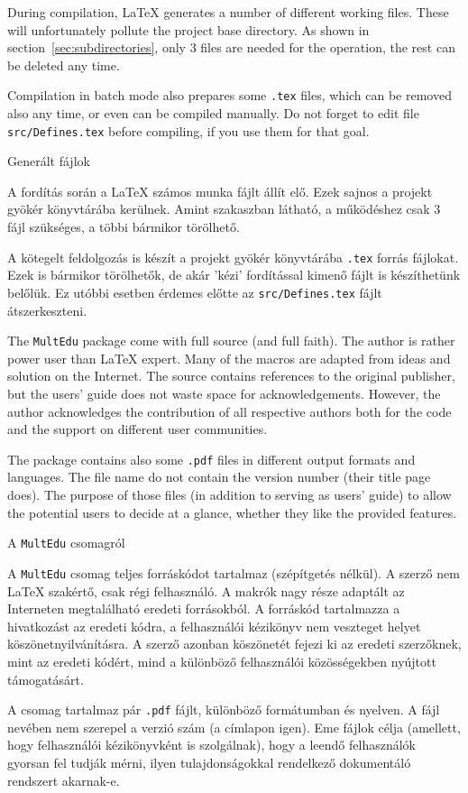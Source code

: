 {
During compilation, \LaTeX{} generates a number of different working files.
These will unfortunately pollute the project base directory. As shown
in section~\ref{sec:subdirectories}, only 3 files are needed for the operation,
the rest can be deleted any time.

Compilation in batch mode also prepares some \lstinline|.tex| files,
which can be removed also any time, or even can be compiled manually. 
Do not forget to edit file \lstinline|src/Defines.tex| before compiling,
if you use them for that goal.
}
{Generált fájlok}
{
A fordítás során a \LaTeX{} számos munka fájlt állít elő.
Ezek sajnos a projekt gyökér könyvtárába kerülnek. Amint  szakaszban látható, a működéshez csak 3 fájl szükséges,
a többi bármikor törölhető.

A kötegelt feldolgozás is készít a projekt gyökér könyvtárába \lstinline|.tex| 
forrás fájlokat. Ezek is bármikor törölhetők, de akár 'kézi' fordítással kimenő fájlt is készíthetünk belőlük. Ez utóbbi esetben érdemes előtte az
 \lstinline|src/Defines.tex| fájlt átszerkeszteni.
}
%


{The \lstinline|MultEdu| package come with full source (and full faith).
The author is rather power user than \LaTeX{} expert. Many of the macros
are adapted from ideas and solution on the Internet. The source contains
references to the original publisher, but the users' guide does not waste space 
for acknowledgements. However, the author acknowledges the contribution
of all respective authors both for the code and the support on different user communities.

The package contains also some \lstinline|.pdf| files in different output
formats and languages. The file name do not contain the version number
(their title page does). The purpose of those files (in addition to
serving as users' guide) to allow the potential users to decide at a glance,
whether they like the provided features.
}
{A \lstinline|MultEdu| csomagról}
{A \lstinline|MultEdu| csomag teljes forráskódot tartalmaz (szépítgetés nélkül).
A szerző nem \LaTeX{} szakértő, csak régi felhasználó.
A makrók nagy része adaptált az Interneten megtalálható eredeti forrásokból.
A forráskód tartalmazza a hivatkozást az eredeti kódra, a felhasználói kézikönyv
nem veszteget  helyet köszönetnyilvánításra. A szerző azonban köszönetét fejezi 
ki az eredeti szerzőknek, mint az eredeti kódért, mind a különböző
felhasználói közösségekben nyújtott támogatásárt.

A csomag tartalmaz pár \lstinline|.pdf| fájlt, különböző formátumban és nyelven.
A fájl nevében nem szerepel a verzió szám (a címlapon igen).
Eme fájlok célja (amellett, hogy felhasználói kézikönyvként is szolgálnak),
hogy a leendő felhasználók gyorsan fel tudják mérni, ilyen tulajdonságokkal
rendelkező dokumentáló rendszert akarnak-e.
}

